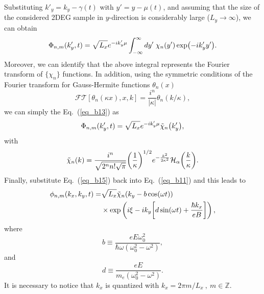 Substituting ${k'_y} = k_y -\gamma(t)$ with $y' = y -\mu(t)$, and assuming that the size of the considered 2DEG sample in $y$-direction is considerably large ($L_y \rightarrow \infty$), we can obtain
\begin{equation} \label{eq_b13}
  \Phi_{n,m}({k'_y} ,t) =
  {\sqrt{L_x}} e^{-i {k'_y}\mu}
  \int_{-\infty}^{\infty} dy'\;
  \chi_{n}\qty(y')
  \exp(-i{k'_y} y').
\end{equation}
Moreover, we can identify that the above integral represents the Fourier transform of $\{\chi_n\}$ functions. In addition, using the symmetric conditions of the Fourier transform for Gauss-Hermite functions $\theta_n(x)$ \cite{celeghini21}
\begin{equation} \label{eq_b14}
  \mathcal{FT}[\theta_n(\kappa x),x,k] = \frac{i^n}{|\kappa|}\theta_n(k/\kappa),
\end{equation}
we can simply the Eq.~(\ref{eq_b13}) as
\begin{equation} \label{eq_b15}
  \Phi_{n,m}({k'_y} ,t) =
    \sqrt{L_x}e^{-i {k'_y}\mu}
    \tilde{\chi}_{n}\qty({k'_y}),
\end{equation}
with
\begin{equation} \label{eq_b16}
  \tilde{\chi}_{n}\qty(k) =
  \frac{i^n}{\sqrt{2^{n} n! \sqrt{\pi}}}
  \qty(\frac{1}{\kappa})^{1/2}
  e^{-\frac{k^2}{2 \kappa^2}}
  \mathcal{H}_{\alpha} \qty(\frac{k}{\kappa}).
\end{equation}
Finally, substitute Eq.~(\ref{eq_b15}) back into Eq.~(\ref{eq_b11}) and this leads to
\begin{equation} \label{eq_b17}
  \begin{aligned}
    \phi_{n,m}(k_x,k_y,t)  = &
    {\sqrt{L_x}}
    \tilde{\chi}_{n}\qty(k_y - b\cos(\omega t)) \\
    & \times
    \text{exp}\left(
      i\xi
      -ik_y  \qty[d\sin(\omega t) + \frac{\hbar k_x}{eB}]
    \right),
  \end{aligned}
\end{equation}
where
\begin{equation} \label{eq_b18}
  b \equiv
  \frac{eE\omega_0^2}{\hbar\omega(\omega_0^2 - \omega^2)},
\end{equation}
and
\begin{equation} \label{eq_b19}
  d \equiv
 \frac{eE}{m_e(\omega_0^2 - \omega^2)}.
\end{equation}
It is necessary to notice that $k_x$ is quantized with $k_x = 2\pi m/L_x ~,~ m \in \mathbb{Z}$.
